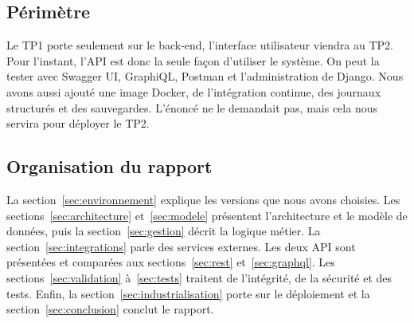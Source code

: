 \subsection{Périmètre}

Le TP1 porte seulement sur le back-end, l'interface utilisateur viendra au TP2. Pour l'instant, l'API est donc la seule façon d'utiliser le système. On peut la tester avec Swagger UI, GraphiQL, Postman et l'administration de Django. Nous avons aussi ajouté une image Docker, de l'intégration continue, des journaux structurés et des sauvegardes. L'énoncé ne le demandait pas, mais cela nous servira pour déployer le TP2.

\subsection{Organisation du rapport}

La section~\ref{sec:environnement} explique les versions que nous avons choisies. Les sections~\ref{sec:architecture} et~\ref{sec:modele} présentent l'architecture et le modèle de données, puis la section~\ref{sec:gestion} décrit la logique métier. La section~\ref{sec:integrations} parle des services externes. Les deux API sont présentées et comparées aux sections~\ref{sec:rest} et~\ref{sec:graphql}. Les sections~\ref{sec:validation} à~\ref{sec:tests} traitent de l'intégrité, de la sécurité et des tests. Enfin, la section~\ref{sec:industrialisation} porte sur le déploiement et la section~\ref{sec:conclusion} conclut le rapport.
